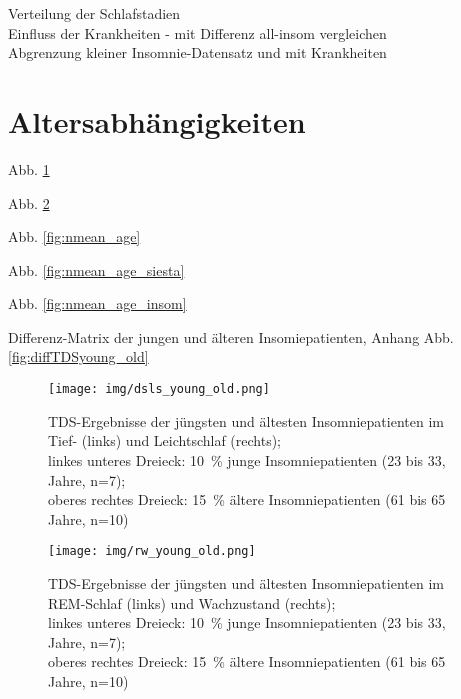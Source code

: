 Verteilung der Schlafstadien\\


Einfluss der Krankheiten - mit Differenz all-insom vergleichen\\

Abgrenzung kleiner Insomnie-Datensatz und mit Krankheiten\\



\section{Altersabhängigkeiten}

Abb. \ref{fig:dsls_young_old}

Abb. \ref{fig:rw_young_old}

Abb. \ref{fig:nmean_age}

Abb. \ref{fig:nmean_age_siesta}

Abb. \ref{fig:nmean_age_insom}

Differenz-Matrix der jungen und älteren Insomiepatienten, Anhang Abb. \ref{fig:diffTDSyoung_old}

\begin{figure}[H]
	\centering
	\texttt{[image: img/dsls\_young\_old.png]}
	\caption[\acs{TDS}-Ergebnisse der jungen und älteren Insomniepatienten im Tief- und Leichtschlaf]{\acs{TDS}-Ergebnisse der jüngsten und ältesten Insomniepatienten im Tief- (links) und Leichtschlaf (rechts);\\linkes unteres Dreieck: 10~\% junge Insomniepatienten (23 bis 33, Jahre, n=7);\\oberes rechtes Dreieck:  15~\% ältere Insomniepatienten (61 bis 65 Jahre, n=10)}
	\label{fig:dsls_young_old}
\end{figure}

\begin{figure}[H]
	\centering
	\texttt{[image: img/rw\_young\_old.png]}
	\caption[\acs{TDS}-Ergebnisse der jüngsten und ältesten Insomniepatienten im REM-Schlaf und Wachzustand]{\acs{TDS}-Ergebnisse der jüngsten und ältesten Insomniepatienten im REM-Schlaf (links) und Wachzustand (rechts);\\linkes unteres Dreieck: 10~\% junge Insomniepatienten (23 bis 33, Jahre, n=7);\\oberes rechtes Dreieck:  15~\% ältere Insomniepatienten (61 bis 65 Jahre, n=10)}
	\label{fig:rw_young_old}
\end{figure}


